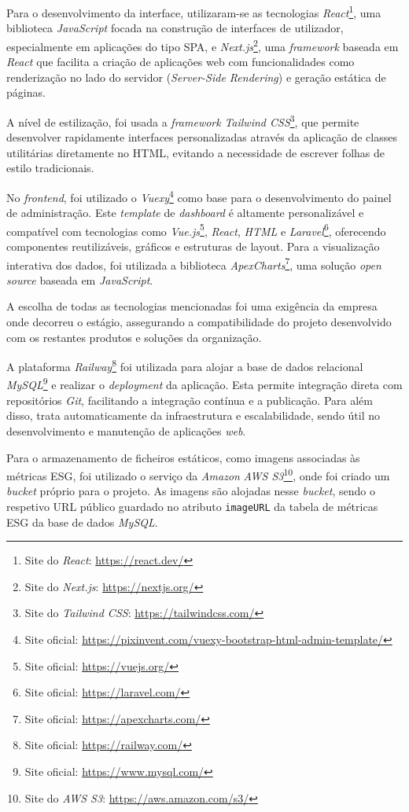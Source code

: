 Para o desenvolvimento da interface, utilizaram-se as tecnologias \textit{React}\footnote{Site do \textit{React}: \url{https://react.dev/}}, uma biblioteca \textit{JavaScript} focada na construção de interfaces de utilizador, especialmente em aplicações do tipo \gls{SPA}, e \textit{Next.js}\footnote{Site do \textit{Next.js}: \url{https://nextjs.org/}}, uma \textit{framework} baseada em \textit{React} que facilita a criação de aplicações web com funcionalidades como renderização no lado do servidor (\textit{Server-Side Rendering}) e geração estática de páginas.

A nível de estilização, foi usada a \textit{framework} \textit{Tailwind CSS}\footnote{Site do \textit{Tailwind CSS}: \url{https://tailwindcss.com/}}, que permite desenvolver rapidamente interfaces personalizadas através da aplicação de classes utilitárias diretamente no HTML, evitando a necessidade de escrever folhas de estilo tradicionais.

No \textit{frontend}, foi utilizado o \textit{Vuexy}\footnote{Site oficial: \url{https://pixinvent.com/vuexy-bootstrap-html-admin-template/}} como base para o desenvolvimento do painel de administração. Este \textit{template} de \textit{dashboard} é altamente personalizável e compatível com tecnologias como \textit{Vue.js}\footnote{Site oficial: \url{https://vuejs.org/}}, \textit{React}, \textit{HTML} e \textit{Laravel}\footnote{Site oficial: \url{https://laravel.com/}}, oferecendo componentes reutilizáveis, gráficos e estruturas de layout. Para a visualização interativa dos dados, foi utilizada a biblioteca \textit{ApexCharts}\footnote{Site oficial: \url{https://apexcharts.com/}}, uma solução \textit{open source} baseada em \textit{JavaScript}.

A escolha de todas as tecnologias mencionadas foi uma exigência da empresa onde decorreu o estágio, assegurando a compatibilidade do projeto desenvolvido com os restantes produtos e soluções da organização.

A plataforma \textit{Railway}\footnote{Site oficial: \url{https://railway.com/}} foi utilizada para alojar a base de dados relacional \textit{MySQL}\footnote{Site oficial: \url{https://www.mysql.com/}} e realizar o \textit{deployment} da aplicação. Esta permite integração direta com repositórios \textit{Git}, facilitando a integração contínua e a publicação. Para além disso, trata automaticamente da infraestrutura e escalabilidade, sendo útil no desenvolvimento e manutenção de aplicações \textit{web}.

Para o armazenamento de ficheiros estáticos, como imagens associadas às métricas ESG, foi utilizado o serviço da \textit{Amazon} \textit{AWS S3}\footnote{Site do \textit{AWS S3}: \url{https://aws.amazon.com/s3/}}, onde foi criado um \textit{bucket} próprio para o projeto. As imagens são alojadas nesse \textit{bucket}, sendo o respetivo URL público guardado no atributo \texttt{imageURL} da tabela de métricas ESG da base de dados \textit{MySQL}. 

